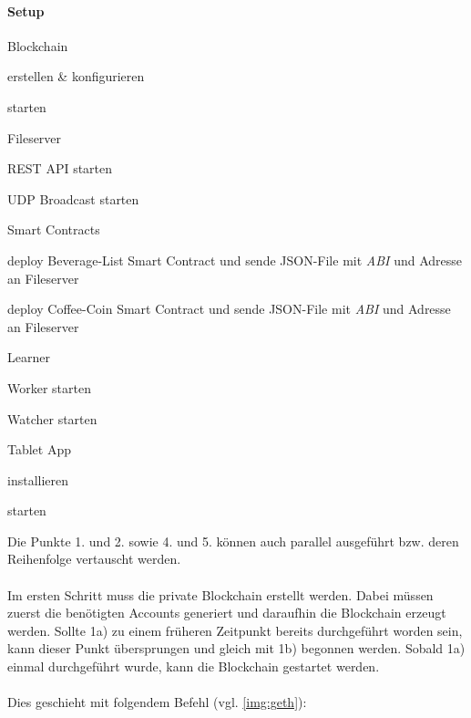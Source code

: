 \paragraph{Setup}
\begin{legal}
	\item {Blockchain}
	\begin{legal}
		\item erstellen \& konfigurieren
		\item starten
	\end{legal}
				      	       	                            
	\item Fileserver
	\begin{legal}
		\item REST API starten
		\item UDP Broadcast starten
	\end{legal}
				      	       	                            
	\item Smart Contracts
	\begin{legal}
		\item deploy Beverage-List Smart Contract und sende JSON-File mit \textit{ABI} und Adresse an Fileserver
		\item deploy Coffee-Coin Smart Contract und sende JSON-File mit \textit{ABI} und Adresse an Fileserver
	\end{legal}
				      	       	                            
	\item Learner
	\begin{legal}
		\item Worker starten
		\item Watcher starten
	\end{legal}
				      	       	                            
	\item Tablet App
	\begin{legal}
		\item installieren
		\item starten
	\end{legal}
				      	       	                                
\end{legal}

Die Punkte 1. und 2. sowie 4. und 5. können auch parallel ausgeführt bzw. deren Reihenfolge vertauscht werden.\\\\
Im ersten Schritt muss die private Blockchain erstellt werden. Dabei müssen zuerst die benötigten Accounts generiert und daraufhin die Blockchain erzeugt werden. Sollte 1a) zu einem früheren Zeitpunkt bereits durchgeführt worden sein, kann dieser Punkt übersprungen und gleich mit 1b) begonnen werden.
Sobald 1a) einmal durchgeführt wurde, kann die Blockchain gestartet werden.
\\\\ Dies geschieht mit folgendem Befehl (vgl. \ref{img:geth}):\\

